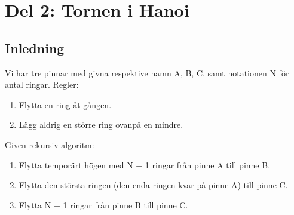 \section{Del 2: Tornen i Hanoi}
\subsection{Inledning}    
Vi har tre pinnar med givna respektive namn A, B, C, samt notationen N för antal ringar.
\newline
Regler:
\begin{enumerate}
\item Flytta en ring åt gången.
\item Lägg aldrig en större ring ovanpå en mindre.
\end{enumerate}

\newline
Given rekursiv algoritm:
\begin{enumerate}
	\item Flytta temporärt högen med N − 1 ringar från pinne A till pinne B.
	\item Flytta den största ringen (den enda ringen kvar på pinne A) till pinne C.
	\item Flytta N − 1 ringar från pinne B till pinne C.
\end{enumerate}

